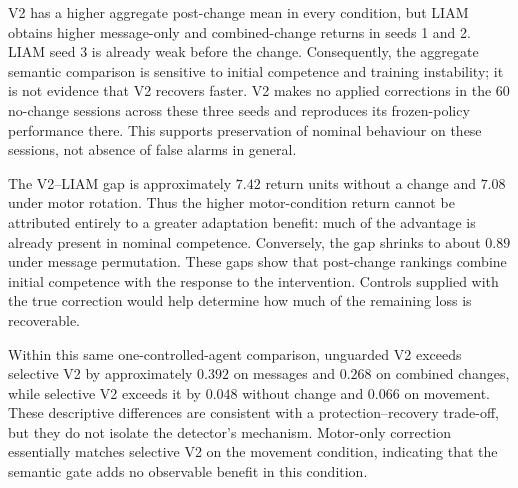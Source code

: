 \documentclass[10pt,a4paper]{article}
\begin{document}
V2 has a higher aggregate post-change mean in every condition, but LIAM obtains higher message-only and combined-change returns in seeds 1 and 2. LIAM seed 3 is already weak before the change. Consequently, the aggregate semantic comparison is sensitive to initial competence and training instability; it is not evidence that V2 recovers faster. V2 makes no applied corrections in the 60 no-change sessions across these three seeds and reproduces its frozen-policy performance there. This supports preservation of nominal behaviour on these sessions, not absence of false alarms in general.

The V2--LIAM gap is approximately $7.42$ return units without a change and $7.08$ under motor rotation. Thus the higher motor-condition return cannot be attributed entirely to a greater adaptation benefit: much of the advantage is already present in nominal competence. Conversely, the gap shrinks to about $0.89$ under message permutation. These gaps show that post-change rankings combine initial competence with the response to the intervention. Controls supplied with the true correction would help determine how much of the remaining loss is recoverable.

Within this same one-controlled-agent comparison, unguarded V2 exceeds selective V2 by approximately $0.392$ on messages and $0.268$ on combined changes, while selective V2 exceeds it by $0.048$ without change and $0.066$ on movement. These descriptive differences are consistent with a protection--recovery trade-off, but they do not isolate the detector's mechanism. Motor-only correction essentially matches selective V2 on the movement condition, indicating that the semantic gate adds no observable benefit in this condition.
\end{document}
